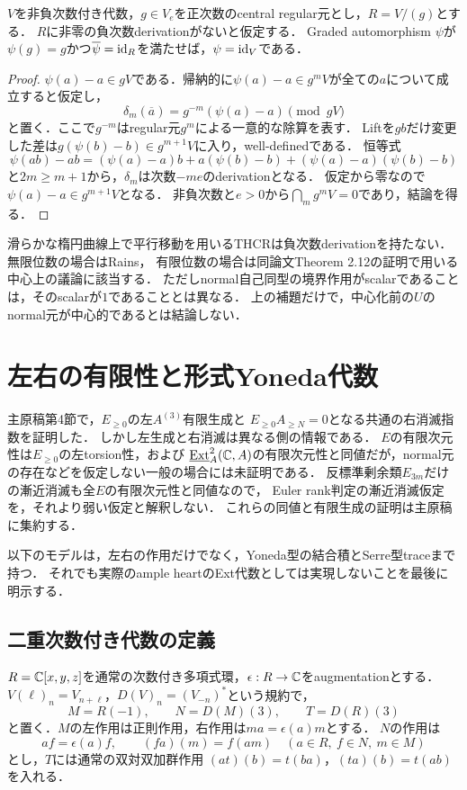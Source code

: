 \documentclass[11pt,a4paper]{ltjsarticle}
\begin{document}
\begin{lemma}[負次数derivationと中心被覆の自己同型の一意性]
\label{lem:v8-central-identity-automorphism}
$V$を非負次数付き代数，$g\in V_e$を正次数のcentral regular元とし，$R=V/(g)$とする．
$R$に非零の負次数derivationがないと仮定する．
Graded automorphism $\psi$が$\psi(g)=g$かつ$\overline\psi=\operatorname{id}_R$を満たせば，$\psi=\operatorname{id}_V$である．
\end{lemma}
\begin{proof}
$\psi(a)-a\in gV$である．帰納的に$\psi(a)-a\in g^mV$が全ての$a$について成立すると仮定し，
\[
 \delta_m(\overline a)=g^{-m}(\psi(a)-a)\pmod{gV}
\]
と置く．ここで$g^{-m}$はregular元$g^m$による一意的な除算を表す．
Liftを$gb$だけ変更した差は$g(\psi(b)-b)\in g^{m+1}V$に入り，well-definedである．
恒等式
\[
 \psi(ab)-ab=(\psi(a)-a)b+a(\psi(b)-b)
              +(\psi(a)-a)(\psi(b)-b)
\]
と$2m\geq m+1$から，$\delta_m$は次数$-me$のderivationとなる．
仮定から零なので$\psi(a)-a\in g^{m+1}V$となる．
非負次数と$e>0$から$\bigcap_mg^mV=0$であり，結論を得る．
\end{proof}

滑らかな楕円曲線上で平行移動を用いるTHCRは負次数derivationを持たない．
無限位数の場合はRains\cite[Lemma 2.11]{RainsFiltered}，
有限位数の場合は同論文Theorem 2.12の証明で用いる中心上の議論に該当する．
ただしnormal自己同型の境界作用がscalarであることは，そのscalarが$1$であることとは異なる．
上の補題だけで，中心化前の$U$のnormal元が中心的であるとは結論しない．

\section{左右の有限性と形式Yoneda代数}\label{sec:formalYoneda}
主原稿第4節で，$E_{\geq0}$の左$A^{(3)}$有限生成と
$E_{\geq0}A_{\geq N}=0$となる共通の右消滅指数を証明した．
しかし左生成と右消滅は異なる側の情報である．
$E$の有限次元性は$E_{\geq0}$の左torsion性，および
$\underline{\operatorname{Ext}}^2_A(\mathbb C,A)$の有限次元性と同値だが，normal元の存在などを仮定しない一般の場合には未証明である．
反標準剰余類$E_{3m}$だけの漸近消滅も全$E$の有限次元性と同値なので，
Euler rank判定の漸近消滅仮定を，それより弱い仮定と解釈しない．
これらの同値と有限生成の証明は主原稿に集約する．

以下のモデルは，左右の作用だけでなく，Yoneda型の結合積とSerre型traceまで持つ．
それでも実際のample heartのExt代数としては実現しないことを最後に明示する．

\subsection{二重次数付き代数の定義}
$R=\mathbb C[x,y,z]$を通常の次数付き多項式環，$\epsilon:R\to\mathbb C$をaugmentationとする．
$V(\ell)_n=V_{n+\ell}$，$D(V)_n=(V_{-n})^*$という規約で，
\[
 M=R(-1),\qquad N=D(M)(3),\qquad T=D(R)(3)
\]
と置く．$M$の左作用は正則作用，右作用は$m a=\epsilon(a)m$とする．
$N$の作用は
\[
 a f=\epsilon(a)f,\qquad(f a)(m)=f(a m)
 \quad(a\in R,\ f\in N,\ m\in M)
\]
とし，$T$には通常の双対双加群作用
$(a t)(b)=t(ba)$，$(t a)(b)=t(ab)$を入れる．
\end{document}
